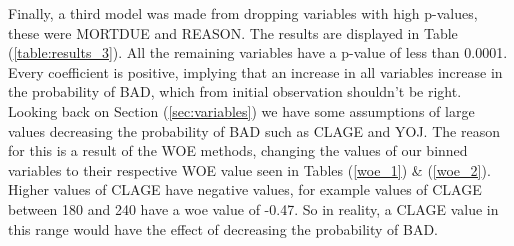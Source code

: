 Finally, a third model was made from dropping variables with high p-values, these were MORTDUE and REASON. The results are displayed in Table (\ref{table:results_3}). All the remaining variables have a p-value of less than 0.0001. Every coefficient is positive, implying that an increase in all variables increase in the probability of BAD, which from initial observation shouldn't be right. Looking back on Section (\ref{sec:variables}) we have some assumptions of large values decreasing the probability of BAD such as CLAGE and YOJ. The reason for this is a result of the WOE methods, changing the values of our binned variables to their respective WOE value seen in Tables (\ref{woe_1}) \& (\ref{woe_2}). Higher values of CLAGE have negative values, for example values of CLAGE between 180 and 240 have a woe value of -0.47. So in reality, a CLAGE value in this range would have the effect of decreasing the probability of BAD. \\

